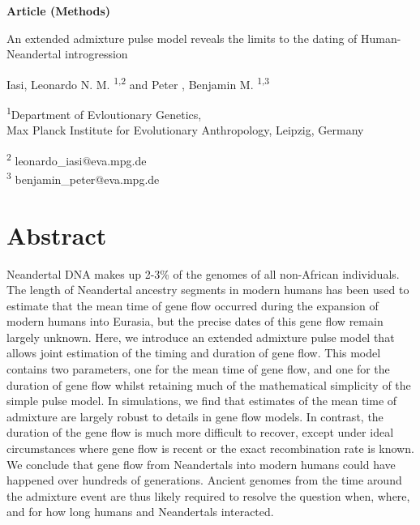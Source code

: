 \documentclass[]{article}
\begin{document}
\begin{titlepage}

    \begin{flushright}
        \large
        \textbf{Article (Methods)}
    \end{flushright}


        \vspace*{1cm}
    \begin{center}       
        \Huge
        \vspace{1cm}
        An extended admixture pulse model reveals the limits to the dating of Human-Neandertal introgression
        
        \vspace{1.0cm}
        \large
        Iasi, Leonardo N. M. \textsuperscript{1,2} and Peter , Benjamin M. \textsuperscript{1,3} \\ 
        
        \vspace{1.0cm}
        
        \textsuperscript{1}Department of Evloutionary Genetics, \\ 
        Max Planck Institute for Evolutionary Anthropology, Leipzig, Germany
        
        \vspace{1.0cm}
        \textsuperscript{2} leonardo\_iasi@eva.mpg.de \\ \textsuperscript{3} 
        benjamin\_peter@eva.mpg.de \\
        \vspace{1.0cm}
    \end{center}  
     

            

\end{titlepage}


\section{Abstract}\label{abstract}

Neandertal DNA makes up 2-3\% of the genomes of all non-African individuals. The length of Neandertal ancestry segments in modern humans has been used to estimate that the mean time of gene flow occurred during the expansion of modern humans into Eurasia, but the precise dates of this gene flow remain largely unknown. Here, we introduce an extended admixture pulse model that allows joint estimation of the timing and duration of gene flow. This model contains two parameters, one for the mean time of gene flow, and one for the duration of gene flow whilst retaining much of the mathematical simplicity of the simple pulse model. In simulations, we find that estimates of the mean time of admixture are largely robust to details in gene flow models. In contrast, the duration of the gene flow is much more difficult to recover, except under ideal circumstances where gene flow is recent or the exact recombination rate is known. We conclude that gene flow from Neandertals into modern humans could have happened over hundreds of generations. Ancient genomes from the time around the admixture event are thus likely required to resolve the question when, where, and for how long humans and Neandertals interacted.
\end{document}
